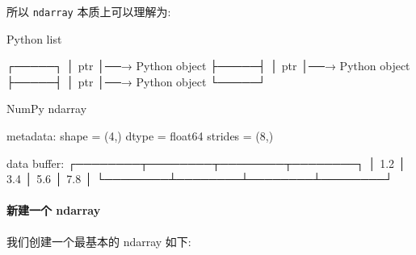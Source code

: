 \documentclass[11pt]{article}
\makeatletter
\newenvironment{Shaded}{}{}
\newcommand{\NormalTok}[1]{{#1}}
\newcommand{\boxspacing}{\kern\kvtcb@left@rule\kern\kvtcb@boxsep}
\newcommand{\prompt}[4]{
        {\ttfamily\llap{{\color{#2}[#3]:\hspace{3pt}#4}}\vspace{-\baselineskip}}
    }
\makeatother
\begin{document}
所以 \texttt{ndarray} 本质上可以理解为:

\begin{Shaded}
\begin{Highlighting}[]
\NormalTok{Python list}

\NormalTok{┌─────┐}
\NormalTok{│ ptr │──→ Python object}
\NormalTok{├─────┤}
\NormalTok{│ ptr │──→ Python object}
\NormalTok{├─────┤}
\NormalTok{│ ptr │──→ Python object}
\NormalTok{└─────┘}

\NormalTok{NumPy ndarray}

\NormalTok{metadata:}
\NormalTok{shape   = (4,)}
\NormalTok{dtype   = float64}
\NormalTok{strides = (8,)}

\NormalTok{data buffer:}
\NormalTok{┌────────┬────────┬────────┬────────┐}
\NormalTok{│ 1.2    │ 3.4    │ 5.6    │ 7.8    │}
\NormalTok{└────────┴────────┴────────┴────────┘}
\end{Highlighting}
\end{Shaded}

\paragraph{新建一个 ndarray}\label{ux65b0ux5efaux4e00ux4e2a-ndarray}

我们创建一个最基本的 ndarray 如下:

    \begin{tcolorbox}[breakable, size=fbox, boxrule=1pt, pad at break*=1mm,colback=cellbackground, colframe=cellborder]
\prompt{In}{incolor}{ }{\boxspacing}
\begin{Verbatim}[commandchars=\\\{\}]

\end{Verbatim}
\end{tcolorbox}


    
    
    
\end{document}
